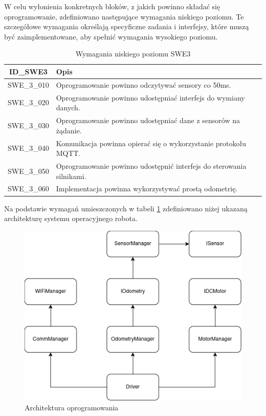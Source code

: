 \documentclass[12pt,twoside]{article}
\begin{document}
W celu wyłonienia konkretnych bloków, z jakich powinno składać się oprogramowanie, zdefiniowano następujące wymagania niskiego poziomu. Te szczegółowe wymagania określają specyficzne zadania i interfejsy, które muszą być zaimplementowane, aby spełnić wymagania wysokiego poziomu.

\begin{table}[ht]
\caption{Wymagania niskiego poziomu SWE3}
\centering		
	\begin{tabular}{|c|p{}|}	
		\hline
		ID\_SWE3 & Opis \\
		\hline
		SWE\_3\_010 & Oprogramowanie powinno odczytywać sensory co 50ms. \\
		\hline
		SWE\_3\_020 & Oprogramowanie powinno udostępniać interfejs do wymiany danych. \\
		\hline 
		SWE\_3\_030 & Oprogramowanie powinno udostępniać dane z sensorów na żądanie.\\
		\hline
		SWE\_3\_040 & Komunikacja powinna opierać się o wykorzystanie protokołu MQTT. \\
		\hline
		SWE\_3\_050 & Oprogramowanie powinno udostępnić interfejs do sterowania silnikami. \\
		\hline
		SWE\_3\_060 & Implementacja powinna wykorzystywać prostą odometrię. \\
				\hline
	\end{tabular}	
	
\label{Tab:SWE3}
\end{table}	

\newpage

Na podstawie wymagań umieszczonych w tabeli \ref{Tab:SWE3} zdefiniowano niżej ukazaną architekturę systemu operacyjnego robota. 

\begin{figure}[ht]%
 \centering%
 \includegraphics[width=12cm]{figures/engSW/block.png}%
 \caption{Architektura oprogramowania}%
 \label{Fig:architektura}%
\end{figure}
\end{document}
